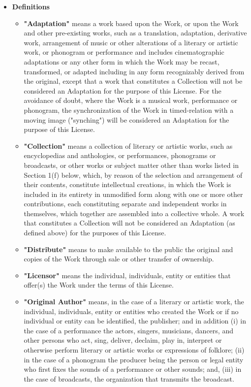 \begin{itemize} 
  \item {\textbf{Definitions}}
  \begin {itemize}
    \item {\textbf{"Adaptation"} means a work based upon the Work, or upon the
    Work and other pre-existing works, such as a translation, adaptation,
    derivative work, arrangement of music or other alterations of a literary or
    artistic work, or phonogram or performance and includes cinematographic
    adaptations or any other form in which the Work may be recast, transformed,
    or adapted including in any form recognizably derived from the original,
    except that a work that constitutes a Collection will not be considered an
    Adaptation for the purpose of this License. For the avoidance of doubt,
    where the Work is a musical work, performance or phonogram, the
    synchronization of the Work in timed-relation with a moving image
    ("synching") will be considered an Adaptation for the purpose of this
    License.}

    \item {\textbf{"Collection"} means a collection of literary or artistic
    works, such as encyclopedias and anthologies, or performances, phonograms or
    broadcasts, or other works or subject matter other than works listed in
    Section 1(f) below, which, by reason of the selection and arrangement of
    their contents, constitute intellectual creations, in which the Work is
    included in its entirety in unmodified form along with one or more other
    contributions, each constituting separate and independent works in
    themselves, which together are assembled into a collective whole. A work
    that constitutes a Collection will not be considered an Adaptation (as
    defined above) for the purposes of this License.}

    \item {\textbf{"Distribute"} means to make available to the public the
    original and copies of the Work through sale or other transfer of
    ownership.}

    \item {\textbf{"Licensor"} means the individual, individuals, entity or
    entities that offer(s) the Work under the terms of this License.}

    \item {\textbf{"Original Author"} means, in the case of a literary or
    artistic work, the individual, individuals, entity or entities who created
    the Work or if no individual or entity can be identified, the publisher; and
    in addition (i) in the case of a performance the actors, singers, musicians,
    dancers, and other persons who act, sing, deliver, declaim, play in,
    interpret or otherwise perform literary or artistic works or expressions of
    folklore; (ii) in the case of a phonogram the producer being the person or
    legal entity who first fixes the sounds of a performance or other sounds;
    and, (iii) in the case of broadcasts, the organization that transmits the
    broadcast.}


\end{itemize}
\end{itemize}
